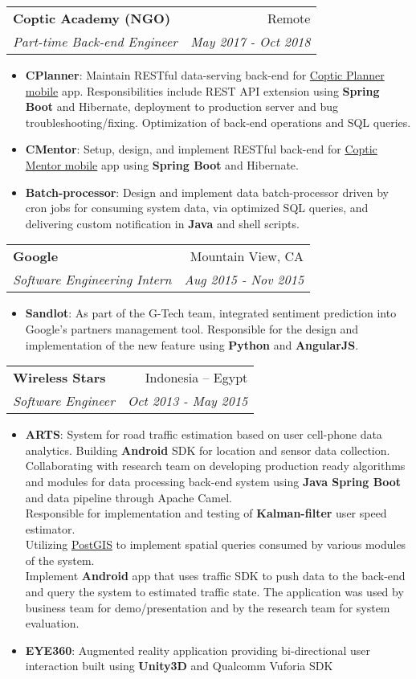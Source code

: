 \documentclass[letterpaper,11pt]{article}
\makeatletter
\newcommand{\resumeItem}[2]{
  \item\small{
    \textbf{#1}{: #2 \vspace{-2pt}}
  }
}
\newcommand{\resumeSubheading}[4]{
  \vspace{-1pt}\item
    \begin{tabular*}{0.97\textwidth}[t]{l@{\extracolsep{\fill}}r}
      \textbf{#1} & #2 \\
      \textit{\small #3} & \textit{\small #4} \\
    \end{tabular*}\vspace{-5pt}
}
\newcommand{\resumeItemListStart}{\begin{itemize}}
\newcommand{\resumeItemListEnd}{\end{itemize}\vspace{-5pt}}
\makeatother
\begin{document}
    \resumeSubheading
      {Coptic Academy (NGO)}{Remote}
      {Part-time Back-end Engineer}{May 2017 - Oct 2018}
      \resumeItemListStart
        \resumeItem{CPlanner}
          {Maintain RESTful data-serving back-end for \href{https://play.google.com/store/apps/details?id=org.copticacademy}{Coptic Planner mobile} app. Responsibilities include REST API extension using \textbf{Spring Boot} and Hibernate, deployment to production server and bug troubleshooting/fixing. Optimization of back-end operations and SQL queries.}
        \resumeItem{CMentor}
          {Setup, design, and implement RESTful back-end for \href{https://play.google.com/store/apps/details?id=org.copticacademy.CopticMentor}{Coptic Mentor mobile} app using \textbf{Spring Boot} and Hibernate.}
        \resumeItem{Batch-processor}
          {Design and implement data batch-processor driven by cron jobs for consuming system data, via optimized SQL queries, and delivering custom notification in \textbf{Java} and shell scripts.}
      \resumeItemListEnd

    \resumeSubheading
      {Google}{Mountain View, CA}
      {Software Engineering Intern}{Aug 2015 - Nov 2015}
      \resumeItemListStart
        \resumeItem{Sandlot}
          {As part of the G-Tech team, integrated sentiment prediction into Google's partners management tool. Responsible for the design and implementation of the new feature using \textbf{Python}
and \textbf{AngularJS}.}
      \resumeItemListEnd

    \resumeSubheading
      {Wireless Stars}{Indonesia -- Egypt}
      {Software Engineer}{Oct 2013 - May 2015}
      \resumeItemListStart
        \resumeItem{ARTS}
          {System for road traffic estimation based on user cell-phone data analytics. Building \textbf{Android} SDK for location and sensor data collection.\\
          Collaborating with research team on developing production ready algorithms and modules for data processing back-end system using \textbf{Java Spring Boot} and data pipeline through Apache Camel.\\
          Responsible for implementation and testing of \textbf{Kalman-filter} user speed estimator.\\
          Utilizing \href{https://postgis.net/}{PostGIS} to implement spatial queries consumed by various modules of the system.\\
          Implement \textbf{Android} app that uses traffic SDK to push data to the back-end and query the system to estimated traffic state. The application was used by business team for demo/presentation and by the research team for system evaluation.}
        \resumeItem{EYE360}
          {Augmented reality application providing bi-directional user interaction built using \textbf{Unity3D} and Qualcomm Vuforia SDK}
      \resumeItemListEnd
\end{document}
